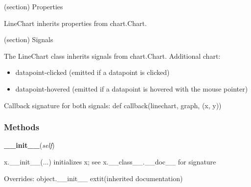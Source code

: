 (section) Properties

  LineChart inherits properties from chart.Chart.

(section) Signals

  The LineChart class inherits signals from chart.Chart. Additional chart:

  \begin{itemize}
  \setlength{\parskip}{0.6ex}
    \item datapoint-clicked (emitted if a datapoint is clicked)

    \item datapoint-hovered (emitted if a datapoint is hovered with the mouse 
      pointer)

  \end{itemize}

  Callback signature for both signals: def callback(linechart, graph, (x, 
  y))



  \subsubsection{Methods}

    \vspace{0.5ex}

\hspace{.8\funcindent}\begin{boxedminipage}{\funcwidth}

    \raggedright \textbf{\_\_init\_\_}(\textit{self})

\setlength{\parskip}{2ex}
    x.\_\_init\_\_(...) initializes x; see x.\_\_class\_\_.\_\_doc\_\_ for 
    signature

\setlength{\parskip}{1ex}
      Overrides: object.\_\_init\_\_ 	extit{(inherited documentation)}

    \end{boxedminipage}

    \label{pygtk_chart:line_chart:LineChart:__iter__}

    \vspace{0.5ex}

